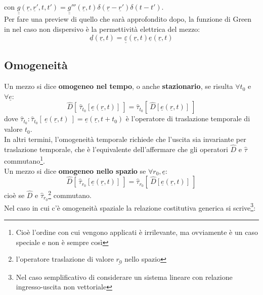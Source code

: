 \documentclass{book}
\begin{document}
            con $\underline{\underline{g}} (\underline{r}, \underline{r}', t, t') = \underline{\underline{g}}'''(\underline{r}, t) \delta(\underline{r}-\underline{r}')\delta(t-t')$. \\
            Per fare una preview di quello che sarà approfondito dopo, la funzione di Green in nel caso non dispersivo è la permettività elettrica del mezzo:
            \begin{equation}
                \underline{d}(\underline{r},t) = \underline{\underline{\varepsilon}} (\underline{r}, t)\underline{e}(\underline{r}, t)
            \end{equation}
            \subsection{Omogeneità}
            Un mezzo si dice \textbf{omogeneo nel tempo}, o anche \textbf{stazionario}, se risulta $\forall t_{0}$ e $\forall \underline{e}$:
            \begin{equation}
                \hat{D} [\ \hat{\tau}_{t_{0}}[\underline{e}(\underline{r}, t)] \ ] = \hat{\tau}_{t_{0}}[\ \hat{D}[\underline{e}(\underline{r},t)]\ ]
            \end{equation}
            dove $\hat{\tau}_{t_{0}} :\hat{\tau}_{t_{0}} [\ \underline{e}(\underline{r},t) \ ] = \underline{e}(\underline{r}, t+t_{0})$ è l'operatore di traslazione temporale di valore $t_{0}$. \\ 
            In altri termini, l'omogeneità temporale richiede che l'uscita sia invariante per traslazione temporale, che è l'equivalente dell'affermare che gli operatori $\hat{D}$ e $\hat{\tau}$ commutano\footnote{Cioè l'ordine con cui vengono applicati è irrilevante, ma ovviamente è un caso speciale e non è sempre così}. \\
            Un mezzo si dice \textbf{omogeneo nello spazio} se $\forall r_{0}, \underline{e}$:
            \begin{equation}
                \hat{D} [\ \hat{\tau}_{r_{0}}[\underline{e}(\underline{r}, t)] \ ] = \hat{\tau}_{r_{0}}[\ \hat{D}[\underline{e}(\underline{r},t)]\ ]
            \end{equation}
            cioè se $\hat{D}$ e $\hat{\tau}_{r_{0}}$\footnote{l'operatore traslazione di valore $\underline{r_{0}}$ nello spazio} commutano. \\
            Nel caso in cui c'è omogeneità spaziale la relazione costitutiva generica si scrive\footnote{Nel caso semplificativo di considerare un sistema lineare con relazione ingresso-uscita non vettoriale}:
\end{document}
